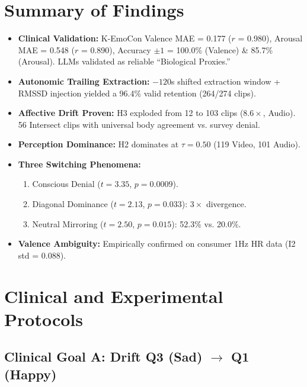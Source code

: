 \documentclass[11pt, a4paper]{report}
\begin{document}
\section{Summary of Findings}
\begin{itemize}
    \item \textbf{Clinical Validation:} K-EmoCon Valence MAE = 0.177 ($r$ = 0.980), Arousal MAE = 0.548 ($r$ = 0.890), Accuracy $\pm 1$ = 100.0\% (Valence) \& 85.7\% (Arousal). LLMs validated as reliable ``Biological Proxies.''
    \item \textbf{Autonomic Trailing Extraction:} $-120$s shifted extraction window + RMSSD injection yielded a 96.4\% valid retention (264/274 clips).
    \item \textbf{Affective Drift Proven:} H3 exploded from 12 to 103 clips ($8.6\times$, Audio). 56 Intersect clips with universal body agreement vs. survey denial.
    \item \textbf{Perception Dominance:} H2 dominates at $\tau = 0.50$ (119 Video, 101 Audio).
    \item \textbf{Three Switching Phenomena:}
    \begin{enumerate}
        \item Conscious Denial ($t = 3.35$, $p = 0.0009$).
        \item Diagonal Dominance ($t = 2.13$, $p = 0.033$): $3\times$ divergence.
        \item Neutral Mirroring ($t = 2.50$, $p = 0.015$): 52.3\% vs. 20.0\%.
    \end{enumerate}
    \item \textbf{Valence Ambiguity:} Empirically confirmed on consumer 1Hz HR data (I2 std = 0.088).
\end{itemize}

\section{Clinical and Experimental Protocols}

\subsection{Clinical Goal A: Drift Q3 (Sad) $\rightarrow$ Q1 (Happy)}
\end{document}
